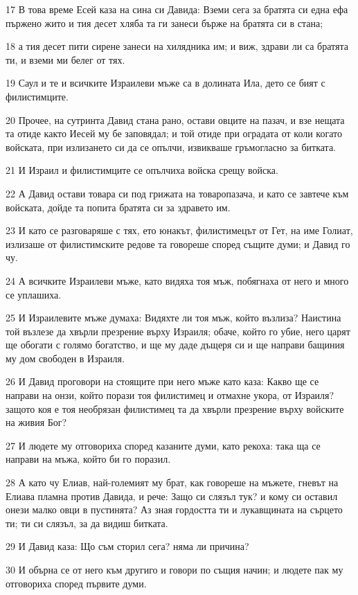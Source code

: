 \par 17 В това време Есей каза на сина си Давида: Вземи сега за братята си една ефа пържено жито и тия десет хляба та ги занеси бърже на братята си в стана;
\par 18 а тия десет пити сирене занеси на хилядника им; и виж, здрави ли са братята ти, и вземи ми белег от тях.
\par 19 Саул и те и всичките Израилеви мъже са в долината Ила, дето се бият с филистимците.
\par 20 Прочее, на сутринта Давид стана рано, остави овците на пазач, и взе нещата та отиде както Иесей му бе заповядал; и той отиде при оградата от коли когато войската, при излизането си да се опълчи, извикваше гръмогласно за битката.
\par 21 И Израил и филистимците се опълчиха войска срещу войска.
\par 22 А Давид остави товара си под грижата на товаропазача, и като се завтече към войската, дойде та попита братята си за здравето им.
\par 23 И като се разговаряше с тях, ето юнакът, филистимецът от Гет, на име Голиат, излизаше от филистимските редове та говореше според същите думи; и Давид го чу.
\par 24 А всичките Израилеви мъже, като видяха тоя мъж, побягнаха от него и много се уплашиха.
\par 25 И Израилевите мъже думаха: Видяхте ли тоя мъж, който възлиза? Наистина той възлезе да хвърли презрение върху Израиля; обаче, който го убие, него царят ще обогати с голямо богатство, и ще му даде дъщеря си и ще направи бащиния му дом свободен в Израиля.
\par 26 И Давид проговори на стоящите при него мъже като каза: Какво ще се направи на онзи, който порази тоя филистимец и отмахне укора, от Израиля? защото коя е тоя необрязан филистимец та да хвърли презрение върху войските на живия Бог?
\par 27 И людете му отговориха според казаните думи, като рекоха: така ща се направи на мъжа, който би го поразил.
\par 28 А като чу Елиав, най-големият му брат, как говореше на мъжете, гневът на Елиава пламна против Давида, и рече: Защо си слязъл тук? и кому си оставил онези малко овци в пустинята? Аз зная гордостта ти и лукавщината на сърцето ти; ти си слязъл, за да видиш битката.
\par 29 И Давид каза: Що съм сторил сега? няма ли причина?
\par 30 И обърна се от него към другиго и говори по същия начин; и людете пак му отговориха според първите думи.
